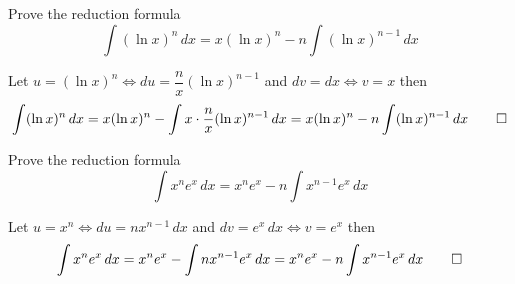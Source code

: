 \begin{problem}
    Prove the reduction formula
    \[\int(\ln x)^n\,dx=x(\ln x)^n-n\int(\ln x)^{n-1}\,dx\]
\end{problem}
\begin{solution}
    Let \(u=(\ln x)^n\iff du=\dfrac{n}{x}(\ln x)^{n-1}\) and \(dv=dx\iff v=x\)
    then
    \[\int(\ln x)^n\,dx=x(\ln x)^n-\int x\cdot\frac{n}{x}(\ln x)^{n-1}\,dx
    =x(\ln x)^n-n\int(\ln x)^{n-1}\,dx\qedhere\]
\end{solution}
\begin{problem}
    Prove the reduction formula
    \[\int x^n e^x\,dx=x^n e^x-n\int x^{n-1}e^x\,dx\]
\end{problem}
\begin{solution}
    Let \(u=x^n\iff du=nx^{n-1}\,dx\) and \(dv=e^x\,dx\iff v=e^x\) then
    \[\int x^n e^x\,dx=x^n e^x-\int nx^{n-1}e^x\,dx
    =x^n e^x-n\int x^{n-1}e^x\,dx\qedhere\]
\end{solution}